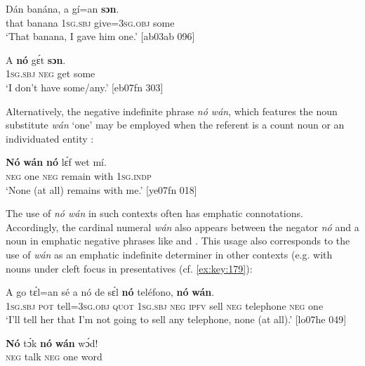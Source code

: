 \ea%
    \label{ex:key:571}
    \gll Dán  banána,  a    gí=an    \textbf{sɔn}.\\
that  banana  \textsc{1sg.sbj}  give=\textsc{3sg.obj}  some\\

\glt ‘That banana, I gave him one.’ [ab03ab 096]
\z


\ea%
    \label{ex:key:572}
    \gll A    \textbf{nó}  gɛ́t  \textbf{sɔn}.\\
\textsc{1sg.sbj}  \textsc{neg}  get  some\\

\glt ‘I don’t have some/any.’ [eb07fn 303]
\z

Alternatively, the negative indefinite phrase \textit{nó wán}, which features the noun substitute \textit{wán} ‘one’ may be employed when the referent is a count noun or an individuated entity :


\ea%
    \label{ex:key:573}
    \gll \textbf{Nó}  \textbf{wán}    \textbf{nó}  lɛ́f    wet    mí.\\
\textsc{neg}  one    \textsc{neg}  remain  with    \textsc{1sg.indp}\\

\glt ‘None (at all) remains with me.’ [ye07fn 018]
\z

The use of \textit{nó wán} in such contexts often has emphatic connotations. Accordingly, the cardinal numeral \textit{wán} also appears between the negator \textit{nó} and a noun in emphatic negative phrases like  and . This usage also corresponds to the use of \textit{wán} as an emphatic indefinite determiner in other contexts (e.g. with nouns under cleft focus in presentatives (cf. \ref{ex:key:179}):


\ea%
    \label{ex:key:574}
    \gll A    go  tɛ́l=an    sé    a    nó  de  sɛ́l  
\textbf{nó}  teléfono,    \textbf{nó}  \textbf{wán}.\\
\textsc{1sg.sbj}  \textsc{pot}  tell=\textsc{3sg.obj}  \textsc{quot}    \textsc{1sg.sbj}  \textsc{neg}  \textsc{ipfv}  sell  
\textsc{neg}  telephone  \textsc{neg}  one\\

\glt ‘I’ll tell her that I’m not going to sell any telephone, none (at all).’ [lo07he 049]
\z


\ea%
    \label{ex:key:575}
    \gll \textbf{Nó}  tɔ́k  \textbf{nó}  \textbf{wán}   wɔ́d!\\
\textsc{neg}  talk  \textsc{neg}  one    word\\

